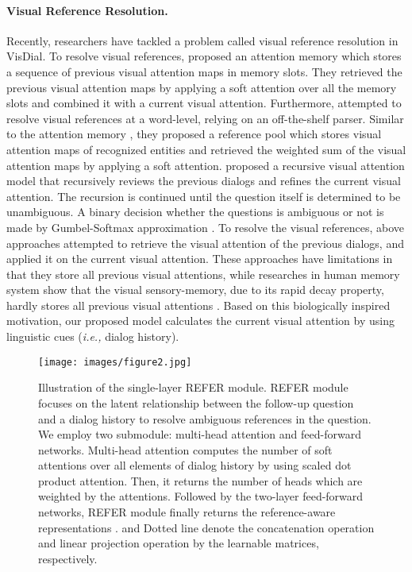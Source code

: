 \documentclass[11pt,a4paper]{article}
\begin{document}
\paragraph{Visual Reference Resolution.} Recently, researchers have tackled a problem called visual reference resolution   \cite{seo2017visual,kottur2018visual,niu2018recursive} in VisDial. To resolve visual references, \cite{seo2017visual} proposed an attention memory which stores a sequence of previous visual attention maps in memory slots. They retrieved the previous visual attention maps by applying a soft attention over all the memory slots and combined it with a current visual attention. Furthermore, \cite{kottur2018visual} attempted to resolve visual references at a word-level, relying on an off-the-shelf parser. Similar to the attention memory \cite{seo2017visual}, they proposed a reference pool which stores visual attention maps of recognized entities and retrieved the weighted sum of the visual attention maps by applying a soft attention. \cite{niu2018recursive} proposed a recursive visual attention model that recursively reviews the previous dialogs and refines the current visual attention. The recursion is continued until the question itself is determined to be unambiguous. A binary decision whether the questions is ambiguous or not is made by Gumbel-Softmax approximation  \cite{jang2016categorical,maddison2016concrete}. To resolve the visual references, above approaches attempted to retrieve the visual attention of the previous dialogs, and applied it on the current visual attention. 
These approaches have limitations in that they store all previous visual attentions, while researches in human memory system show that the visual sensory-memory, due to its rapid decay property, hardly stores all previous visual attentions \cite{sperling1960information,sergent2011top}. Based on this biologically inspired motivation, our proposed model calculates the current visual attention by using linguistic cues ({\it i.e.,} dialog history). 

\begin{figure*}[ht!]
\label{figure:architecture2}
\centering
\texttt{[image: images/figure2.jpg]}
\caption{Illustration of the single-layer REFER module. REFER module focuses on the latent relationship between the follow-up question and a dialog history to resolve ambiguous references in the question. We employ two submodule: multi-head attention and feed-forward networks. Multi-head attention computes the  number of soft attentions over all elements of dialog history by using scaled dot product attention. Then, it returns the  number of heads which are weighted by the attentions. Followed by the two-layer feed-forward networks, REFER module finally returns the reference-aware representations .  and Dotted line denote the concatenation operation and linear projection operation by the learnable matrices, respectively.}
\end{figure*}
\end{document}
